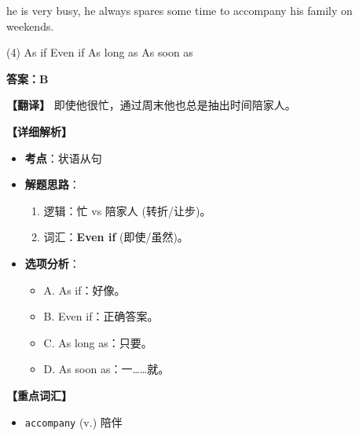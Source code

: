 \documentclass[11pt, a4paper]{article}
\newcommand{\analysis}[4]{
    \begin{solutionbox}
        \textbf{答案：#1}
        
        \textbf{【翻译】} #2
        
        \textbf{【详细解析】}
        #3
        
        \textbf{【重点词汇】}
        #4
    \end{solutionbox}
}
\newcommand{\blank}{\underline{\hspace{1.5cm}}}
\begin{document}
\begin{questions}
    \item \blank he is very busy, he always spares some time to accompany his family on weekends.
    \begin{tasks}(4)
        \task As if \task Even if \task As long as \task As soon as
    \end{tasks}
    \analysis{B}{即使他很忙，通过周末他也总是抽出时间陪家人。}{
        \begin{itemize}
            \item \textbf{考点}：状语从句
            \item \textbf{解题思路}：
                \begin{enumerate}
                    \item 逻辑：忙 vs 陪家人 (转折/让步)。
                    \item 词汇：\textbf{Even if} (即使/虽然)。
                \end{enumerate}
            \item \textbf{选项分析}：
                \begin{itemize}
                    \item A. As if：好像。
                    \item B. Even if：正确答案。
                    \item C. As long as：只要。
                    \item D. As soon as：一……就。
                \end{itemize}
        \end{itemize}
    }{
        \begin{itemize}
            \item \texttt{accompany} (v.) 陪伴
        \end{itemize}
    }


\end{questions}
\end{document}
